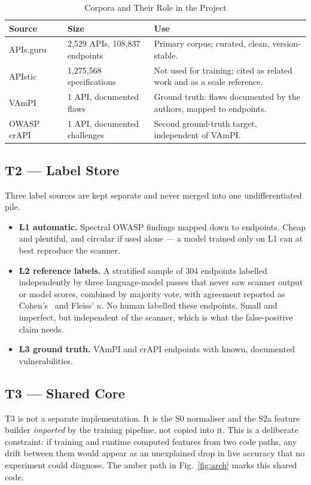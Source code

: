 \documentclass[conference]{IEEEtran}
\begin{document}
\begin{table}[!t]
\caption{Corpora and Their Role in the Project}
\label{tab:corpora}
\centering
\footnotesize
\begin{tabularx}{\columnwidth}{L{1.7cm} L{1.9cm} Y}
\toprule
\textbf{Source} & \textbf{Size} & \textbf{Use}\\
\midrule
APIs.guru~\cite{apisguru} & 2{,}529 APIs, 108{,}837 endpoints & Primary corpus; curated,
clean, version-stable.\\
APIstic~\cite{apistic} & 1{,}275{,}568 specifications & Not used for training; cited as related work and as a scale reference.\\
VAmPI~\cite{vampi} & 1 API, documented flaws & Ground truth: flaws documented by the
authors, mapped to endpoints.\\
OWASP crAPI~\cite{crapi} & 1 API, documented challenges & Second ground-truth target,
independent of VAmPI.\\
\bottomrule
\end{tabularx}
\end{table}

\subsection{T2 --- Label Store}
Three label sources are kept separate and never merged into one undifferentiated pile.

\begin{itemize}
\item \textbf{L1 automatic.} Spectral OWASP findings mapped down to endpoints. Cheap and
plentiful, and circular if used alone --- a model trained only on L1 can at best reproduce
the scanner.
\item \textbf{L2 reference labels.} A stratified sample of 304 endpoints labelled independently
by three language-model passes that never saw scanner output or model scores, combined by
majority vote, with agreement reported as Cohen's~\cite{cohen} and Fleiss' $\kappa$. No human labelled
these endpoints. Small and imperfect, but independent of the scanner, which is what the
false-positive claim needs.
\item \textbf{L3 ground truth.} VAmPI and crAPI endpoints with known, documented
vulnerabilities.
\end{itemize}

\subsection{T3 --- Shared Core}
T3 is not a separate implementation. It is the S0 normaliser and the S2a feature builder
\emph{imported} by the training pipeline, not copied into it. This is a deliberate
constraint: if training and runtime computed features from two code paths, any drift between
them would appear as an unexplained drop in live accuracy that no experiment could diagnose.
The amber path in Fig.~\ref{fig:arch} marks this shared code.
\end{document}
